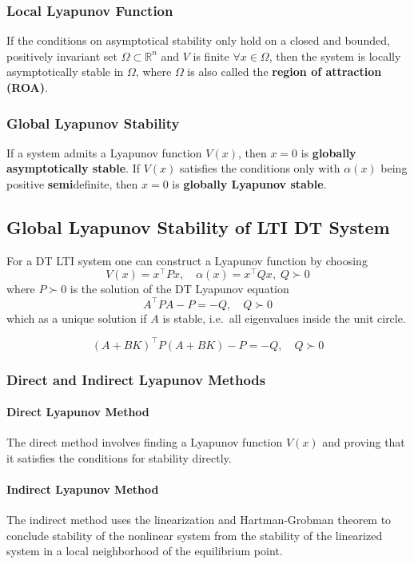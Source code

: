 \subsubsection{Local Lyapunov Function}
If the conditions on asymptotical stability only hold on a closed and bounded, positively invariant set $\Omega \subset \mathbb{R}^n$ and $V$ is finite $\forall x \in \Omega$, then the system is locally asymptotically stable in $\Omega$, where $\Omega$ is also called the \textbf{region of attraction (ROA)}.

\subsubsection{Global Lyapunov Stability}
If a system admits a Lyapunov function $V(x)$, then $x=0$ is \textbf{globally asymptotically stable}.
\newpar{}
If $V(x)$ satisfies the conditions only with $\alpha(x)$ being positive \textbf{semi}definite, then $x=0$ is \textbf{globally Lyapunov stable}.

\subsection{Global Lyapunov Stability of LTI DT System}
For a DT LTI system one can construct a Lyapunov function by choosing
\begin{equation*}
    V(x) = x^\top Px,\quad \alpha(x) = x^\top Q x, \;Q \succ 0
\end{equation*}
where $P\succ0$ is the solution of the DT Lyapunov equation
\begin{equation*}
    A^\top PA -P = -Q, \quad Q \succ 0
\end{equation*}
which as a unique solution if $A$ is stable, i.e.\ all eigenvalues inside the unit circle.

\newpar{}
\begin{equation*}
    {(A+BK)}^\top P{(A+BK)} -P = -Q, \quad Q\succ 0
\end{equation*}

\subsubsection{Direct and Indirect Lyapunov Methods}
\paragraph{Direct Lyapunov Method}
The direct method involves finding a Lyapunov function $V(x)$ and proving that it satisfies the conditions for stability directly.

\paragraph{Indirect Lyapunov Method}
The indirect method uses the linearization and Hartman-Grobman theorem to conclude stability of the nonlinear system from the stability of the linearized system in a local neighborhood of the equilibrium point.